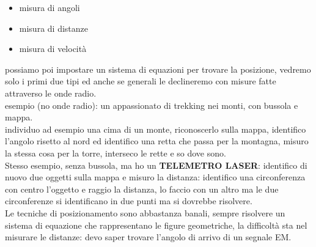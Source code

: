 \documentclass[oneside, 12pt]{extbook}
\begin{document}
\begin{itemize}
	\item misura di angoli
	\item misura di distanze
	\item misura di velocità
\end{itemize}
possiamo poi impostare un sistema di equazioni per trovare la posizione, vedremo solo i primi due tipi ed anche se generali le declineremo con misure fatte attraverso le onde radio.
\\esempio (no onde radio): un appassionato di trekking nei monti, con bussola e mappa.\\
individuo ad esempio una cima di un monte, riconoscerlo sulla mappa, identifico l'angolo risetto al nord ed identifico una retta che passa per la montagna, misuro la stessa cosa per la torre, interseco le rette e so dove sono.\\
Stesso esempio, senza bussola, ma ho un \textbf{TELEMETRO LASER}: identifico di nuovo due oggetti sulla mappa e misuro la distanza: identifico una circonferenza con centro l'oggetto e raggio la distanza, lo faccio con un altro ma le due circonferenze si identificano in due punti ma si dovrebbe risolvere.\\
Le tecniche di posizionamento sono abbastanza banali, sempre risolvere un sistema di equazione che rappresentano le figure geometriche, la difficoltà sta nel misurare le distanze: devo saper trovare l'angolo di arrivo di un segnale EM.
\end{document}
